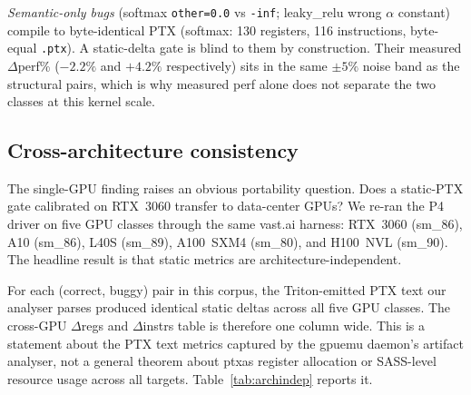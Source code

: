 \documentclass[runningheads]{llncs}
\begin{document}
\textit{Semantic-only bugs} (softmax \texttt{other=0.0} vs
\texttt{-inf}; leaky\_relu wrong $\alpha$ constant) compile to
byte-identical PTX (softmax: 130 registers, 116 instructions, byte-equal
\texttt{.ptx}). A static-delta gate is blind to them by construction.
Their measured $\Delta$perf\% ($-2.2\%$ and $+4.2\%$ respectively)
sits in the same $\pm 5\%$ noise band as the structural pairs, which
is why measured perf alone does not separate the two classes at this
kernel scale.

\subsection{Cross-architecture consistency}
\label{sec:eval:cross}

The single-GPU finding raises an obvious portability question. Does a
static-PTX gate calibrated on RTX~3060 transfer to data-center GPUs?
We re-ran the P4 driver on five GPU classes through the same vast.ai
harness: RTX~3060 (sm\_86), A10 (sm\_86), L40S (sm\_89),
A100~SXM4 (sm\_80), and H100~NVL (sm\_90). The headline result is
that static metrics are architecture-independent.

For each (correct, buggy) pair in this corpus, the Triton-emitted
PTX text our analyser parses produced identical static deltas across
all five GPU classes. The cross-GPU $\Delta$regs and $\Delta$instrs
table is therefore one column wide. This is a statement about the
PTX text metrics captured by the gpuemu daemon's artifact analyser,
not a general theorem about ptxas register allocation or SASS-level
resource usage across all targets. Table~\ref{tab:archindep} reports
it.
\end{document}
